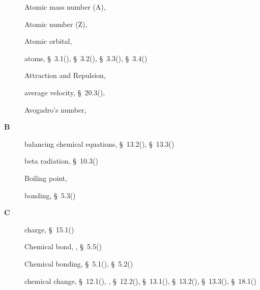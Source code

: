 \begin{multicols}{2}
{\begin{description}
	  \item[] \noindent\raggedright Atomic mass number (A),  \pageref{id2416571}
	  
	  \item[] \noindent\raggedright Atomic number (Z),  \pageref{id2416514}
	  
	  \item[] \noindent\raggedright Atomic orbital,  \pageref{id2420554}
	  
	  \item[] \noindent\raggedright atoms,  \S~3.1(\pageref{m38756}),  \S~3.2(\pageref{m38745}),  \S~3.3(\pageref{m38753}),  \S~3.4(\pageref{m38741})
	  
	  \item[] \noindent\raggedright Attraction and Repulsion,  \pageref{id2471643}
	  
	  \item[] \noindent\raggedright average velocity,  \S~20.3(\pageref{m38791}),  \pageref{id2528820}
	  
	  \item[] \noindent\raggedright Avogadro's number,  \pageref{id2496617}
	  \vspace{.3cm}
	  \item[{\large \bfseries B}]\noindent\raggedright
	  balancing chemical equations,  \S~13.2(\pageref{m38726}),  \S~13.3(\pageref{m38727})
	  
	  \item[] \noindent\raggedright beta radiation,  \S~10.3(\pageref{m38779})
	  
	  \item[] \noindent\raggedright Boiling point,  \pageref{id2412302}
	  
	  \item[] \noindent\raggedright bonding,  \S~5.3(\pageref{m38684})
	  \vspace{.3cm}
	  \item[{\large \bfseries C}]\noindent\raggedright
	  charge,  \S~15.1(\pageref{m38780})
	  
	  \item[] \noindent\raggedright Chemical bond,  \pageref{id2427062},  \S~5.5(\pageref{m38689})
	  
	  \item[] \noindent\raggedright Chemical bonding,  \S~5.1(\pageref{m38704}),  \S~5.2(\pageref{m38701})
	  
	  \item[] \noindent\raggedright chemical change,  \S~12.1(\pageref{m38709}),  \pageref{id2458579},  \S~12.2(\pageref{m38711}),  \S~13.1(\pageref{m38721}),  \S~13.2(\pageref{m38726}),  \S~13.3(\pageref{m38727}),  \S~18.1(\pageref{m38717})
	  

\end{description}}
\end{multicols}
